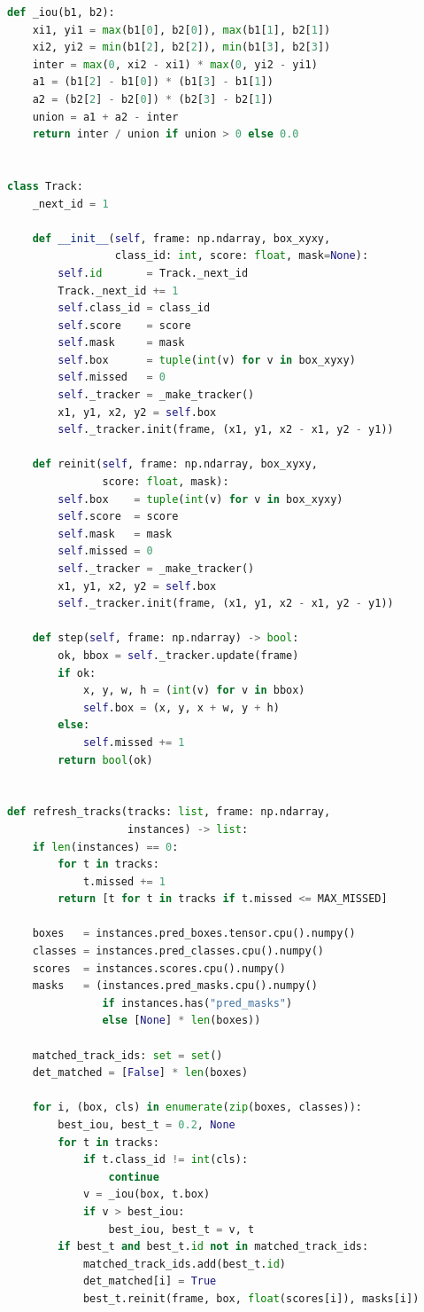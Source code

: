 \documentclass[14pt,a4paper]{extreport}
\begin{document}
\begin{lstlisting}[language=Python]
def _iou(b1, b2):
    xi1, yi1 = max(b1[0], b2[0]), max(b1[1], b2[1])
    xi2, yi2 = min(b1[2], b2[2]), min(b1[3], b2[3])
    inter = max(0, xi2 - xi1) * max(0, yi2 - yi1)
    a1 = (b1[2] - b1[0]) * (b1[3] - b1[1])
    a2 = (b2[2] - b2[0]) * (b2[3] - b2[1])
    union = a1 + a2 - inter
    return inter / union if union > 0 else 0.0


class Track:
    _next_id = 1

    def __init__(self, frame: np.ndarray, box_xyxy,
                 class_id: int, score: float, mask=None):
        self.id       = Track._next_id
        Track._next_id += 1
        self.class_id = class_id
        self.score    = score
        self.mask     = mask
        self.box      = tuple(int(v) for v in box_xyxy)
        self.missed   = 0
        self._tracker = _make_tracker()
        x1, y1, x2, y2 = self.box
        self._tracker.init(frame, (x1, y1, x2 - x1, y2 - y1))

    def reinit(self, frame: np.ndarray, box_xyxy,
               score: float, mask):
        self.box    = tuple(int(v) for v in box_xyxy)
        self.score  = score
        self.mask   = mask
        self.missed = 0
        self._tracker = _make_tracker()
        x1, y1, x2, y2 = self.box
        self._tracker.init(frame, (x1, y1, x2 - x1, y2 - y1))

    def step(self, frame: np.ndarray) -> bool:
        ok, bbox = self._tracker.update(frame)
        if ok:
            x, y, w, h = (int(v) for v in bbox)
            self.box = (x, y, x + w, y + h)
        else:
            self.missed += 1
        return bool(ok)


def refresh_tracks(tracks: list, frame: np.ndarray,
                   instances) -> list:
    if len(instances) == 0:
        for t in tracks:
            t.missed += 1
        return [t for t in tracks if t.missed <= MAX_MISSED]

    boxes   = instances.pred_boxes.tensor.cpu().numpy()
    classes = instances.pred_classes.cpu().numpy()
    scores  = instances.scores.cpu().numpy()
    masks   = (instances.pred_masks.cpu().numpy()
               if instances.has("pred_masks")
               else [None] * len(boxes))

    matched_track_ids: set = set()
    det_matched = [False] * len(boxes)

    for i, (box, cls) in enumerate(zip(boxes, classes)):
        best_iou, best_t = 0.2, None
        for t in tracks:
            if t.class_id != int(cls):
                continue
            v = _iou(box, t.box)
            if v > best_iou:
                best_iou, best_t = v, t
        if best_t and best_t.id not in matched_track_ids:
            matched_track_ids.add(best_t.id)
            det_matched[i] = True
            best_t.reinit(frame, box, float(scores[i]), masks[i])


\end{lstlisting}
\end{document}
